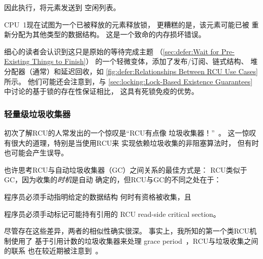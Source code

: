 {{\begin{enumerate}
\begin{fcvref}
		因此执行，将元素发送到
		空闲列表。
	\item	CPU~1现在试图为一个已被释放的元素释放锁，
		更糟糕的是，该元素可能已被
		重新分配为其他类型的数据结构。
		这是一个致命的内存损坏错误。
	\end{fcvref}
	\end{enumerate}
}\QuickQuizEndM
%
\QuickQuizEndE
}

细心的读者会认识到这只是原始的等待完成主题
（\cref{sec:defer:Wait for Pre-Existing Things to Finish}）
的一个轻微变体，添加了发布/订阅、链式结构、
堆分配器（通常）和延迟回收，如
\cref{fig:defer:Relationships Between RCU Use Cases}所示。
他们可能还会注意到，与
\cref{sec:locking:Lock-Based Existence Guarantees}
中讨论的基于锁的存在性保证相比，
这具有死锁免疫的优势。

\subsubsection{轻量级垃圾收集器}
\label{sec:defer:Light-Weight Garbage Collector}

初次了解RCU的人常发出的一个惊叹是``RCU有点像
垃圾收集器！''~\cite{MattKline2023LockBasedLocklessFresh}。
这一惊叹有很大的道理，特别是当使用RCU来
实现依赖垃圾收集的非阻塞算法时，
但有时也可能会产生误导。

也许思考RCU与自动垃圾收集器（GC）之间关系的最佳方式是：
RCU类似于GC，因为收集的\emph{时机}是自动
确定的，但RCU与GC的不同之处在于：
\begin{enumerate*}[(1)]
\item 程序员必须手动指明给定的数据结构
何时有资格被收集，且
\item 程序员必须手动标记可能持有引用的
RCU read-side critical section。
\end{enumerate*}

尽管存在这些差异，两者的相似性确实很深。
事实上，我所知的第一个类RCU机制使用了
基于引用计数的垃圾收集器来处理
grace period~\cite{Kung80}，RCU与垃圾收集之间的联系
也在较近期被注意到~\cite{HarshalSheth2016goRCU}。

